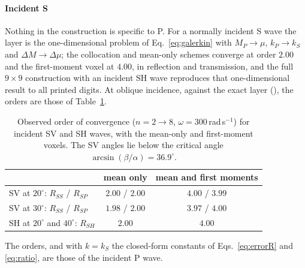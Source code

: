 \documentclass[preprint,review,12pt]{elsarticle}
\begin{document}
\paragraph{Incident S} Nothing in the construction is specific to P. For a normally incident S wave
the layer is the one-dimensional problem of Eq.~\eqref{eq:galerkin} with $M_P\to\mu$, $k_P\to k_S$ and
$\Delta M\to\Delta\mu$; the collocation and mean-only schemes converge at order $2.00$ and the
first-moment voxel at $4.00$, in reflection and transmission, and the full $9\times9$ construction
with an incident SH wave reproduces that one-dimensional result to all printed digits. At oblique
incidence, against the exact layer (), the orders are those of
Table~\ref{tab:incS}.
\begin{table}[htbp]
\centering
\caption{Observed order of convergence ($n=2\to8$, $\omega=300$\,rad\,s$^{-1}$) for incident SV and SH waves, with the mean-only and first-moment voxels. The SV angles lie below the critical angle $\arcsin(\beta/\alpha)=36.9^\circ$.}\label{tab:incS}
\small
\begin{tabular}{@{}lcc@{}}
\toprule
 & mean only & mean and first moments \\
\midrule
SV at $20^\circ$: $R_{SS}$ / $R_{SP}$ & $2.00$ / $2.00$ & $4.00$ / $3.99$ \\
SV at $30^\circ$: $R_{SS}$ / $R_{SP}$ & $1.98$ / $2.00$ & $3.97$ / $4.00$ \\
SH at $20^\circ$ and $40^\circ$: $R_{SH}$ & $2.00$ & $4.00$ \\
\bottomrule
\end{tabular}
\end{table}
The orders, and with $k=k_S$ the closed-form constants of
Eqs.~\eqref{eq:errorR} and \eqref{eq:ratio}, are those of the incident P wave.
\end{document}
